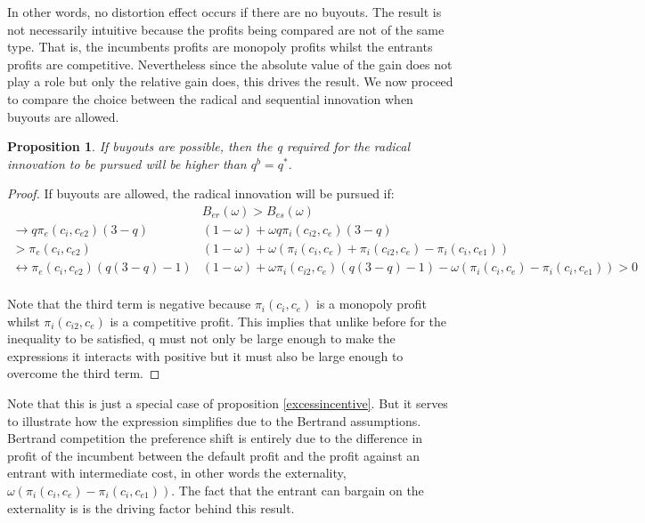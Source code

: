 \documentclass[11pt]{article}
\newtheorem{proposition}{Proposition}
\begin{document}
In other words, no distortion effect occurs if there are no buyouts. The result is not necessarily intuitive because the profits being compared are not of the same type. That is, the incumbents profits are monopoly profits whilst the entrants profits are competitive. Nevertheless since the absolute value of the gain does not play a role but only the relative gain does, this drives the result.
We now proceed to compare the choice between the radical and sequential innovation when buyouts are allowed.

\begin{proposition}
\label{higherq}
If buyouts are possible, then the q required for the radical innovation to be pursued will be higher than $q^b=q^*$. 
\end{proposition}

\begin{proof}
If buyouts are allowed, the radical innovation will be pursued if:
\begin{align*}
&B_{er}(\omega)>B_{es}(\omega) \\
\rightarrow q \pi_{e}(c_{i},c_{e2})(3-q)&(1-\omega)
+ \omega q 
\pi_{i}(c_{i2},c_{e}) (3-q) \\
> \pi_{e}(c_{i},c_{e2})&(1-\omega)+ \omega (\pi_{i}(c_{i},c_{e}) +  \pi_{i}(c_{i2},c_{e}) - \pi_{i}(c_{i},c_{e1}) ) \\
\leftrightarrow \pi_{e}(c_{i},c_{e2})(q(3-q)-1)&(1-\omega)
+ \omega \pi_{i}(c_{i2},c_{e}) (q(3-q)-1)-\omega(\pi_{i}(c_{i},c_{e})- \pi_{i}(c_{i},c_{e1})) 
> 0 \\
\end{align*}

Note that the third term is negative because $\pi_{i}(c_{i},c_{e})$ is a monopoly profit whilst  $\pi_{i}(c_{i2},c_{e})$ is a competitive profit. This implies that unlike before for the inequality to be satisfied, q must not only be large enough to make the expressions it interacts with positive but it must also be large enough to overcome the third term.
\end{proof}

Note that this is just a special case of proposition \ref{excessincentive}. But it serves to illustrate how the expression simplifies due to the Bertrand assumptions. Bertrand competition the preference shift is entirely due to the difference in profit of the incumbent between the default profit and the profit against an entrant with intermediate cost, in other words the externality,   $\omega(\pi_i(c_i,c_e)- \pi_i(c_i,c_{e1})) $. The fact that the entrant can bargain on the externality is is the driving factor behind this result. 
\end{document}
